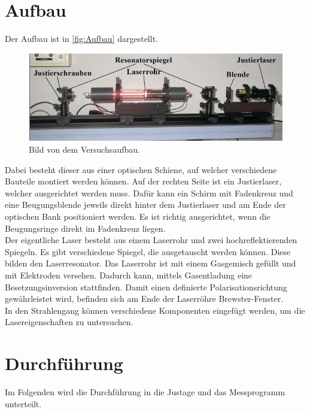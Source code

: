 \section{Aufbau}
\label{sec:Aufbau}
Der Aufbau ist in \autoref{fig:Aufbau} dargestellt.
\begin{figure}[H]
    \centering
    \includegraphics[scale=0.7]{Abbildungen/Aufbau.png}
    \caption{Bild von dem Versuchsaufbau.\cite{V61}}
    \label{fig:Aufbau}
\end{figure}
Dabei besteht dieser aus einer optischen Schiene, auf welcher verschiedene Bauteile montiert werden können.
Auf der rechten Seite ist ein Justierlaser, welcher ausgerichtet werden muss. Dafür kann ein Schirm mit Fadenkreuz und eine Beugungsblende
jeweils direkt hinter dem Justierlaser und am Ende der optischen Bank positioniert werden. Es ist richtig ausgerichtet, wenn die 
Beugungsringe direkt im Fadenkreuz liegen.\\
Der eigentliche Laser besteht aus einem Laserrohr und zwei hochreflektierenden Spiegeln.
Es gibt verschiedene Spiegel, die ausgetauscht werden können. Diese bilden den Laserresonator.
Das Laserrohr ist mit einem Gasgemisch gefüllt und mit Elektroden versehen. Dadurch kann, mittels Gasentladung eine Besetzungsinversion stattfinden.
Damit einen definierte Polarisationsrichtung gewährleistet wird, befinden sich am Ende der Laserröhre Brewster-Fenster.\\
In den Strahlengang können verschiedene Komponenten eingefügt werden, um die Lasereigenschaften zu untersuchen.

\section{Durchführung}
\label{sec:Durchführung}
Im Folgenden wird die Durchführung in die Justage und das Messprogramm unterteilt.

